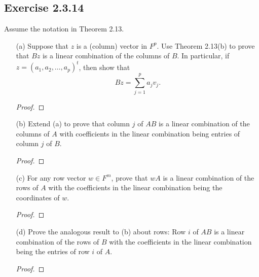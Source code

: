 \subsection*{Exercise 2.3.14} Assume the notation in Theorem 2.13.
\begin{enumerate}
    \item[(a)] Suppose that \( z  \) is a (column) vector in \( F^{p} \). Use Theorem 2.13(b) to prove that \( Bz  \) is a linear combination of the columns of \( B  \). In particular, if \( z = ({a}_{1}, {a}_{2}, \dots, {a}_{p})^{t} \), then show that  
        \[  Bz = \sum_{ j=1  }^{ p  } {a}_{j} {v}_{j}. \]
        \begin{proof}
        
        \end{proof}
    \item[(b)] Extend (a) to prove that column \( j  \) of \( AB  \) is a linear combination of the columns of \( A  \) with coefficients in the linear combination being entries of column \( j  \) of \(  B \). 
        \begin{proof}
        
        \end{proof}
    \item[(c)] For any row vector \( w \in F^{m} \), prove that \( wA  \) is a linear combination of the rows of \( A  \) with the coefficients in the linear combination being the coordinates of \( w  \).
        \begin{proof}
        
        \end{proof}
    \item[(d)] Prove the analogous result to (b) about rows: Row \( i \) of \( AB  \) is a linear combination of the rows of \( B  \) with the coefficients in the linear combination being the entries of row \( i  \) of \( A  \).
        \begin{proof}
        
        \end{proof}

\end{enumerate}
